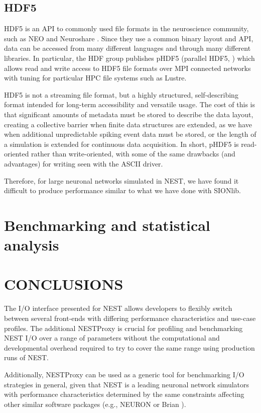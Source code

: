 \documentclass[]{YIC2015}
\begin{document}
\subsection{HDF5}
\label{sec:hdf5}
HDF5 is an API to commonly used file formats in the neuroscience
community, such as NEO \cite{neo} and Neuroshare \cite{neuroshare}.
Since they use a common binary layout and API, data can be accessed
from many different languages and through many different libraries. In
particular, the HDF group publishes pHDF5 (parallel HDF5, \cite{hdf5})
which allows read and write access to HDF5 file formats over MPI
connected networks with tuning for particular HPC file systems such as
Lustre.

HDF5 is not a streaming file format, but a highly structured,
self-describing format intended for long-term accessibility and
versatile usage. The cost of this is that significant amounts of
metadata must be stored to describe the data layout, creating a
collective barrier when finite data structures are extended, as we
have when additional unpredictable spiking event data must be stored,
or the length of a simulation is extended for continuous data
acquisition. In short, pHDF5 is read-oriented rather than
write-oriented, with some of the same drawbacks (and advantages) for
writing seen with the ASCII driver.

Therefore, for large neuronal networks simulated in NEST, we have
found it difficult to produce performance similar to what we have done
with SIONlib.

\section{Benchmarking and statistical analysis}


\section{CONCLUSIONS}

The I/O interface presented for NEST allows developers to flexibly
switch between several front-ends with differing performance
characteristics and use-case profiles. The additional NESTProxy is
crucial for profiling and benchmarking NEST I/O over a range of
parameters without the computational and developmental overhead
required to try to cover the same range using production runs of
NEST.

Additionally, NESTProxy can be used as a generic tool for benchmarking
I/O strategies in general, given that NEST is a leading neuronal
network simulators with performance characteristics determined by the
same constraints affecting other similar software packages (e.g., NEURON
\cite{neuron} or Brian \cite{brian}).
\end{document}

